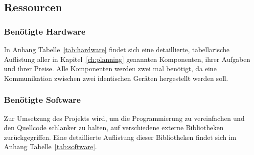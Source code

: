 \documentclass[a4paper, 11pt]{scrartcl}
\begin{document}
\subsection{Ressourcen}

\subsubsection{Benötigte Hardware}
In Anhang Tabelle~\ref{tab:hardware} findet sich eine detaillierte, tabellarische Auflistung aller in Kapitel~\ref{ch:planning} genannten Komponenten, ihrer Aufgaben und ihrer Preise.
Alle Komponenten werden zwei mal benötigt, da eine Kommunikation zwischen zwei identischen Geräten hergestellt werden soll.

\subsubsection{Benötigte Software}
Zur Umsetzung des Projekts wird, um die Programmierung zu vereinfachen und den Quellcode schlanker zu halten, auf verschiedene externe Bibliotheken zurückgegriffen.
Eine detaillierte Auflistung dieser Bibliotheken findet sich im Anhang Tabelle~\ref{tab:software}.
\end{document}
